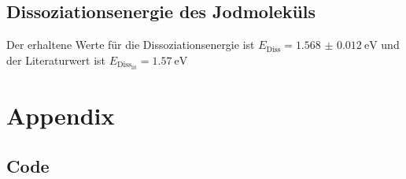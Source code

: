 \documentclass[12pt,english,ngerman]{scrartcl}
\begin{document}
\subsection{Dissoziationsenergie des Jodmoleküls}

Der erhaltene Werte für die Dissoziationsenergie ist $E_\text{Diss} =
	\SI{1.568(12)}{\electronvolt}$ und der Literaturwert ist
$E_{\text{Diss}_\text{lit}} =
	\SI{1.57}{\electronvolt}$~\cite{noauthor_bond-dissociation_2023}

\newpage

\section*{Appendix}\label{sec:Appendix}
\subsection*{Code}\label{sec:code}



\printbibliography
\listoffigures
\listoftables
\end{document}
